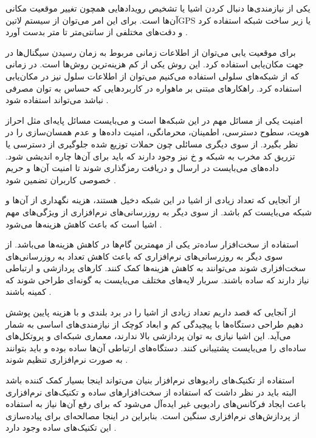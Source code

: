 
یکی از نیازمندی‌ها دنبال کردن اشیا یا تشخیص رویدادهایی همچون تغییر موقعیت مکانی آن‌ها است.
برای این امر می‌توان از سیستم ‌لاتین{GPS} یا زیر ساخت شبکه استفاده کرد و دقت‌های مختلفی
از سانتی‌متر تا متر بدست آورد
.

برای موقعیت یابی می‌توان از اطلاعات زمانی مربوط به زمان رسیدن سیگنال‌ها در جهت مکان‌یابی استفاده کرد. این روش
یکی از کم هزینه‌ترین روش‌ها است. در زمانی که از شبکه‌های سلولی استفاده می‌کنیم می‌توان از اطلاعات سلول نیز
در مکان‌یابی استفاده کرد. راهکارهای مبتنی بر ماهواره در کاربردهایی که حساس به توان مصرفی نباشد می‌تواند استفاده شود
.


امنیت یکی از مسائل مهم در این شبکه‌ها است و می‌بایست مسائل پایه‌ای
مثل احراز هویت، سطوح دسترسی، اطمینان، محرمانگی، امنیت داده‌ها و عدم همسان‌سازی را در نظر بگیرد.
از سوی دیگری مسائلی چون حملات توزیع شده جلوگیری از دسترسی یا تزریق کد مخرب به شبکه و ‌خ
نیز وجود دارند که باید برای آن‌ها چاره اندیشی شود.
داده‌های می‌بایست در ارسال و دریافت رمزگذاری شوند تا امنیت آن‌ها و حریم خصوصی کاربران تضمین شود
.


از آنجایی که تعداد زیادی از اشیا در این شبکه دخیل هستند، هزینه نگهداری از آن‌ها و شبکه می‌بایست کم باشد.
از سوی دیگر به روزرسانی‌های نرم‌افزاری از ویژگی‌های مهم اشیا است که باعث کاهش هزینه‌ها می‌شود
.

استفاده از سخت‌افزار ساده‌تر یکی از مهمترین گام‌ها در کاهش هزینه‌ها می‌باشد. از سوی دیگر به روزرسانی‌های
نرم‌افزاری که باعث کاهش تعداد به روزرسانی‌های سخت‌افزاری شوند می‌توانند به کاهش هزینه‌ها کمک کنند.
کارهای پردازشی و ارتباطی نیاز دارند که ساده باشند. سربار لایه‌های مختلف می‌بایست به گونه‌ای طراحی شوند
که کمینه باشند
.


از آنجایی که قصد داریم تعداد زیادی از اشیا را در برد بلندی و با هزینه پایین پوشش دهیم طراحی دستگاه‌ها با پیچیدگی کم
و ابعاد کوچک از نیازمندی‌های اساسی به شمار می‌آید. این اشیا نیازی به توان پردازشی بالا ندارند، معماری شبکه‌ای و پروتکل‌های
ساده‌ای را می‌بایست پشتیبانی کنند. دستگاه‌های ارتباطی آن‌ها ساده بوده و باید بتوانند به صورت نرم‌افزاری تنظیم شوند
.

استفاده از تکنیک‌های رادیوهای نرم‌افزار بنیان می‌تواند اینجا بسیار کمک کننده باشد
البته باید در نظر داشت که استفاده از سخت‌افزارهای ساده و تکنیک‌های نرم‌افزاری
باعث ایجاد فرکانس‌های رادیویی غیر ایده‌آل می‌شود که برای رفع آن‌ها نیاز به استفاده
از پردازش‌های نرم‌افزاری سنگین است. بنابراین در اینجا مصالحه‌ای برای پیاده‌سازی
این تکنیک‌های ساده وجود دارد
.

